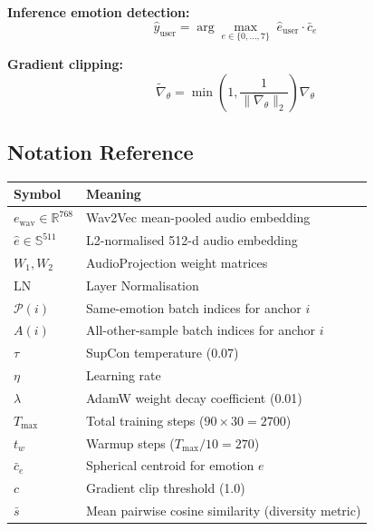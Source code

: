 \documentclass[12pt,a4paper]{article}
\theoremstyle{definition}
\theoremstyle{plain}
\theoremstyle{remark}
\begin{document}
\textbf{Inference emotion detection:}
\[
  \hat{y}_{\text{user}} = \arg\max_{e\in\{0,\ldots,7\}}\;\hat{e}_{\text{user}}\cdot\bar{c}_e
\]

\textbf{Gradient clipping:}
\[
  \tilde{\nabla}_\theta = \min\!\left(1,\frac{1}{\|\nabla_\theta\|_2}\right)\nabla_\theta
\]

\subsection{Notation Reference}

\begin{center}
\renewcommand{\arraystretch}{1.15}
\begin{tabular}{@{}lp{9.5cm}@{}}
\toprule
\textbf{Symbol} & \textbf{Meaning} \\
\midrule
$e_{\text{wav}} \in\mathbb{R}^{768}$ & Wav2Vec mean-pooled audio embedding \\
$\hat{e} \in\mathbb{S}^{511}$ & L2-normalised 512-d audio embedding \\
$W_1,W_2$ & AudioProjection weight matrices \\
$\mathrm{LN}$ & Layer Normalisation \\
$\mathcal{P}(i)$ & Same-emotion batch indices for anchor $i$ \\
$A(i)$ & All-other-sample batch indices for anchor $i$ \\
$\tau$ & SupCon temperature (0.07) \\
$\eta$ & Learning rate \\
$\lambda$ & AdamW weight decay coefficient (0.01) \\
$T_{\max}$ & Total training steps ($90\times30=2700$) \\
$t_w$ & Warmup steps ($T_{\max}/10=270$) \\
$\bar{c}_e$ & Spherical centroid for emotion $e$ \\
$c$ & Gradient clip threshold (1.0) \\
$\bar{s}$ & Mean pairwise cosine similarity (diversity metric) \\
\bottomrule
\end{tabular}
\end{center}
\end{document}
